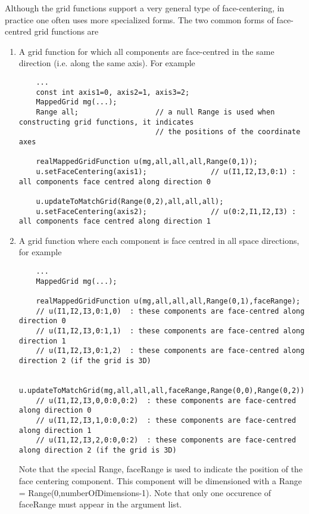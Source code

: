 Although the grid functions support a very general type of
face-centering, in practice one often uses more
specialized forms. The two common forms of face-centred
grid functions are
\begin{enumerate}
  \item A grid function for which all components are face-centred
        in the same direction (i.e. along the same axis). For example
  {\footnotesize\begin{verbatim}
    ...
    const int axis1=0, axis2=1, axis3=2;
    MappedGrid mg(...);
    Range all;                  // a null Range is used when constructing grid functions, it indicates
                                // the positions of the coordinate axes

    realMappedGridFunction u(mg,all,all,all,Range(0,1));
    u.setFaceCentering(axis1);               // u(I1,I2,I3,0:1) : all components face centred along direction 0

    u.updateToMatchGrid(Range(0,2),all,all,all);
    u.setFaceCentering(axis2);               // u(0:2,I1,I2,I3) : all components face centred along direction 1
  \end{verbatim}
  }
  \item A grid function where each component is face centred in all space directions, for example
  {\footnotesize\begin{verbatim}
    ...
    MappedGrid mg(...);
  
    realMappedGridFunction u(mg,all,all,all,Range(0,1),faceRange);  
    // u(I1,I2,I3,0:1,0)  : these components are face-centred along direction 0
    // u(I1,I2,I3,0:1,1)  : these components are face-centred along direction 1
    // u(I1,I2,I3,0:1,2)  : these components are face-centred along direction 2 (if the grid is 3D)

    u.updateToMatchGrid(mg,all,all,all,faceRange,Range(0,0),Range(0,2));
    // u(I1,I2,I3,0,0:0,0:2)  : these components are face-centred along direction 0
    // u(I1,I2,I3,1,0:0,0:2)  : these components are face-centred along direction 1
    // u(I1,I2,I3,2,0:0,0:2)  : these components are face-centred along direction 2 (if the grid is 3D)
  \end{verbatim}
  }
  Note that the special Range, {\ff faceRange} is used to indicate the position of the face centering 
  component. This component will be dimensioned with a Range = Range(0,numberOfDimensions-1).
  Note that only one occurence of {\ff faceRange} must appear in the argument list.
\end{enumerate}

